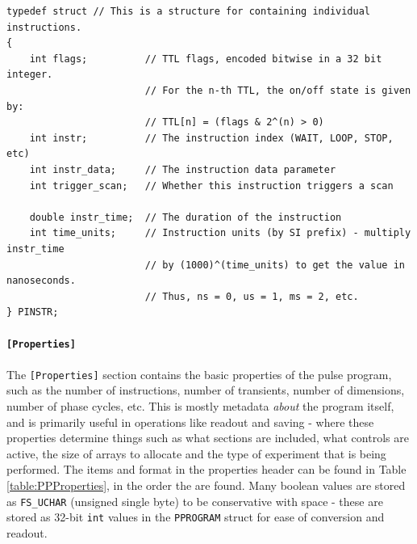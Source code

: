 \documentclass[PaulGanssle-Thesis.tex]{subfiles}
\begin{document}
\begin{lstlisting}[caption={The \texttt{PINSTR} structure used to store individual pulse instructions.}, label={code:PINSTR struct}]
typedef struct // This is a structure for containing individual instructions.
{
	int flags;			// TTL flags, encoded bitwise in a 32 bit integer.
						// For the n-th TTL, the on/off state is given by:
						// TTL[n] = (flags & 2^(n) > 0)
	int instr;			// The instruction index (WAIT, LOOP, STOP, etc)
	int instr_data;		// The instruction data parameter
	int trigger_scan;	// Whether this instruction triggers a scan
	
	double instr_time;	// The duration of the instruction 
	int time_units;		// Instruction units (by SI prefix) - multiply instr_time
						// by (1000)^(time_units) to get the value in nanoseconds.
						// Thus, ns = 0, us = 1, ms = 2, etc.
} PINSTR;
\end{lstlisting}

\paragraph{\texttt{[Properties]}}
\label{Section:PropertiesHeader}
The \texttt{[Properties]} section contains the basic properties of the pulse program, such as the number of instructions, number of transients, number of dimensions, number of phase cycles, etc. This is mostly metadata \emph{about} the program itself, and is primarily useful in operations like readout and saving - where these properties determine things such as what sections are included, what controls are active, the size of arrays to allocate and the type of experiment that is being performed. The items and format in the properties header can be found in Table \ref{table:PPProperties}, in the order the are found. Many boolean values are stored as \verb|FS_UCHAR| (unsigned single byte) to be conservative with space - these are stored as 32-bit \lstinline|int| values in the \verb|PPROGRAM| struct for ease of conversion and readout.
\end{document}
